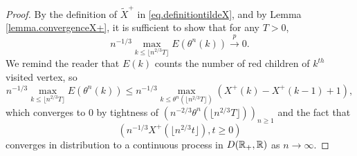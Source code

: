 \begin{proof}
By the definition of $\tilde{X}^+$ in \eqref{eq.definitiontildeX}, and by Lemma \ref{lemma.convergenceX+}, it is sufficient to show that for any $T>0$,
$$n^{-1/3}\max_{k\leq \lfloor n^{2/3}T\rfloor}E(\theta^{n}(k))\overset{p}{\to}0.$$
We remind the reader that $E(k)$ counts the number of red children of $k^{th}$ visited vertex, so
$$n^{-1/3}\max_{k\leq \lfloor n^{2/3}T\rfloor}E(\theta^{n}(k))\leq n^{-1/3}\max_{k\leq \theta^{n}(\lfloor n^{2/3}T\rfloor)}(X^+(k)-X^+(k-1)+1),$$
which converges to $0$ by tightness of $\left(n^{-2/3}\theta^{n}(\lfloor n^{2/3}T\rfloor)\right)_{n\geq 1}$ and the fact that $$\left(n^{-1/3}X^+\left(\lfloor n^{2/3}t\rfloor\right),t\geq 0\right)$$ converges in distribution to a continuous process in $D({\mathbb R}_+,{\mathbb R})$ as $n\to\infty$.
\end{proof}

